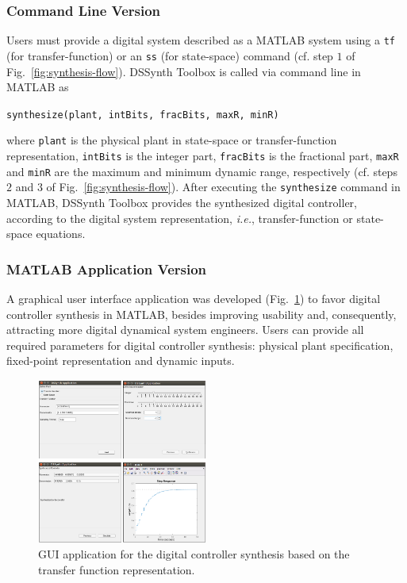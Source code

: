 \documentclass[10pt,conference]{IEEEtran}
\newcommand\tool{{DSSynth Toolbox}\xspace}
\begin{document}
\subsubsection{Command Line Version}

Users must provide a digital system described as a MATLAB system 
using a \texttt{tf} (for transfer-function) or an \texttt{ss} (for state-space) 
command (cf. step $1$ of Fig.~\ref{fig:synthesis-flow}).
\tool is called via command line in MATLAB as 

\begin{center} 
\texttt{synthesize(plant, intBits, fracBits, maxR, minR)}
\end{center} 

\noindent where \texttt{plant} is the physical plant in state-space or transfer-function representation, 
\texttt{intBits} is the integer part, \texttt{fracBits} is the fractional part, \texttt{maxR} and \texttt{minR} 
are the maximum and minimum dynamic range, respectively (cf. steps $2$ and $3$ of Fig.~\ref{fig:synthesis-flow}).
%
After executing the \texttt{synthesize} command in MATLAB, 
\tool provides the synthesized digital controller, according to 
the digital system representation, {\it i.e.}, transfer-function or 
state-space equations. 

\subsubsection{MATLAB Application Version} 

A graphical user interface application was developed (Fig.~\ref{fig:gui-for-tf}) 
to favor digital controller synthesis in MATLAB, besides improving usability and, 
consequently, attracting more digital dynamical system engineers. Users can provide all 
required parameters for digital controller synthesis: physical plant specification, 
fixed-point representation and dynamic inputs. 
%
\begin{figure}
  \includegraphics[width=0.5\textwidth]{screens_dssynth.png}
  \caption{GUI application for the digital controller synthesis based on the transfer function representation.}
  \label{fig:gui-for-tf}
\end{figure}
\end{document}
